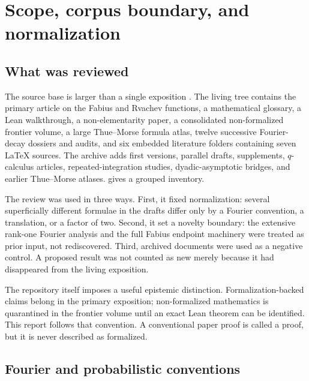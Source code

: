 \documentclass[11pt,oneside]{article}
\theoremstyle{definition}
\theoremstyle{remark}
\begin{document}
\clearpage

\clearpage

\section{Scope, corpus boundary, and normalization}\label{p3:sec:scope}

\subsection{What was reviewed}

The source base is larger than a single exposition \cite{p3:repo-docs}.  The living tree contains the primary article on the Fabius and Rvachev functions, a mathematical glossary, a Lean walkthrough, a non-elementarity paper, a consolidated non-formalized frontier volume, a large Thue--Morse formula atlas, twelve successive Fourier-decay dossiers and audits, and six embedded literature folders containing seven LaTeX sources.  The archive adds first versions, parallel drafts, supplements, $q$-calculus articles, repeated-integration studies, dyadic-asymptotic bridges, and earlier Thue--Morse atlases.   gives a grouped inventory.

The review was used in three ways.  First, it fixed normalization: several superficially different formulae in the drafts differ only by a Fourier convention, a translation, or a factor of two.  Second, it set a novelty boundary: the extensive rank-one Fourier analysis and the full Fabius endpoint machinery were treated as prior input, not rediscovered.  Third, archived documents were used as a negative control.  A proposed result was not counted as new merely because it had disappeared from the living exposition.

The repository itself imposes a useful epistemic distinction.  Formalization-backed claims belong in the primary exposition; non-formalized mathematics is quarantined in the frontier volume until an exact Lean theorem can be identified.  This report follows that convention.  A conventional paper proof is called a proof, but it is never described as formalized.

\subsection{Fourier and probabilistic conventions}
\end{document}
